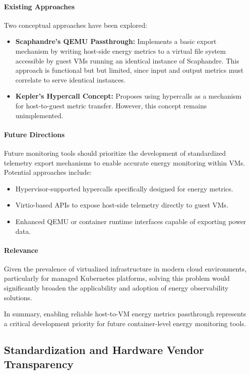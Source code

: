 \paragraph{Existing Approaches}
Two conceptual approaches have been explored:
\begin{itemize}
    \item \textbf{Scaphandre’s QEMU Passthrough:} Implements a basic export mechanism by writing host-side energy metrics to a virtual file system accessible by guest VMs running an identical instance of Scaphandre. This approach is functional but but limited, since input and output metrics must correlate to serve identical instances.
    \item \textbf{Kepler’s Hypercall Concept:} Proposes using hypercalls as a mechanism for host-to-guest metric transfer. However, this concept remains unimplemented.
\end{itemize}

\paragraph{Future Directions}
Future monitoring tools should prioritize the development of standardized telemetry export mechanisms to enable accurate energy monitoring within VMs. Potential approaches include:
\begin{itemize}
    \item Hypervisor-supported hypercalls specifically designed for energy metrics.
    \item Virtio-based APIs to expose host-side telemetry directly to guest VMs.
    \item Enhanced QEMU or container runtime interfaces capable of exporting power data.
\end{itemize}

\paragraph{Relevance}
Given the prevalence of virtualized infrastructure in modern cloud environments, particularly for managed Kubernetes platforms, solving this problem would significantly broaden the applicability and adoption of energy observability solutions.

In summary, enabling reliable host-to-VM energy metrics passthrough represents a critical development priority for future container-level energy monitoring tools.

\subsection{Standardization and Hardware Vendor Transparency}
\label{sec:future-standardization}


